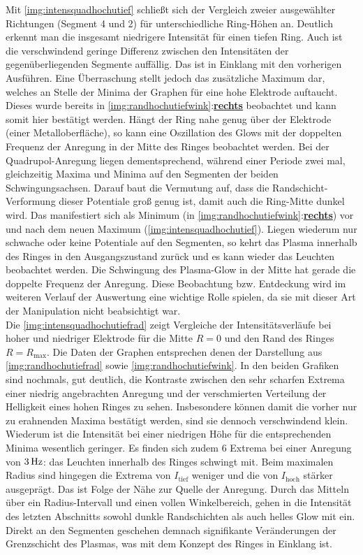 \documentclass[numbers=noenddot,a4paper,notitlepage,twoside,BCOR15mm]{scrbook}
\newcommand{\ix}[1]{_\text{#1}}
\newcommand{\fett}[1]{\textbf{#1}}
\begin{document}
					Mit \autoref{img:intensquadhochutief} schließt sich der Vergleich zweier ausgewählter Richtungen (Segment 4 und 2) für unterschiedliche Ring-Höhen an. Deutlich erkennt man die insgesamt niedrigere Intensität für einen tiefen Ring. Auch ist die verschwindend geringe Differenz zwischen den Intensitäten der gegenüberliegenden Segmente auffällig. Das ist in Einklang mit den vorherigen Ausführen. Eine Überraschung stellt jedoch das zusätzliche Maximum dar, welches an Stelle der Minima der Graphen für eine hohe Elektrode auftaucht. Dieses wurde bereits in \autoref{img:randhochutiefwink}:\underline{\fett{rechts}} beobachtet und kann somit hier bestätigt werden. Hängt der Ring nahe genug über der Elektrode (einer Metalloberfläche), so kann eine Oszillation des Glows mit der doppelten Frequenz der Anregung in der Mitte des Ringes beobachtet werden. Bei der Quadrupol-Anregung liegen dementsprechend, während einer Periode zwei mal, gleichzeitig Maxima und Minima auf den Segmenten der beiden Schwingungsachsen. Darauf baut die Vermutung auf, dass die Randschicht-Verformung dieser Potentiale groß genug ist, damit auch die Ring-Mitte dunkel wird. Das manifestiert sich als Minimum (in \autoref{img:randhochutiefwink}:\underline{\fett{rechts}}) vor und nach dem neuen Maximum (\autoref{img:intensquadhochutief}). Liegen wiederum nur schwache oder keine Potentiale auf den Segmenten, so kehrt das Plasma innerhalb des Ringes in den Ausgangszustand zurück und es kann wieder das Leuchten beobachtet werden. Die Schwingung des Plasma-Glow in der Mitte hat gerade die doppelte Frequenz der Anregung. Diese Beobachtung bzw. Entdeckung wird im weiteren Verlauf der Auswertung eine wichtige Rolle spielen, da sie mit dieser Art der Manipulation nicht beabsichtigt war.\\
					Die \autoref{img:intensquadhochutiefrad} zeigt Vergleiche der Intensitätsverläufe bei hoher und niedriger Elektrode für die Mitte $R=0$ und den Rand des Ringes $R=R\ix{max}$. Die Daten der Graphen entsprechen denen der Darstellung aus \autoref{img:randhochutiefrad} sowie \autoref{img:randhochutiefwink}. In den beiden Grafiken sind nochmals, gut deutlich, die Kontraste zwischen den sehr scharfen Extrema einer niedrig angebrachten Anregung und der verschmierten Verteilung der Helligkeit eines hohen Ringes zu sehen. Insbesondere können damit die vorher nur zu erahnenden Maxima bestätigt werden, sind sie dennoch verschwindend klein. Wiederum ist die Intensität bei einer niedrigen Höhe für die entsprechenden Minima wesentlich geringer. Es finden sich zudem 6 Extrema bei einer Anregung von $\unit[3]{Hz}$: das Leuchten innerhalb des Ringes schwingt mit. Beim maximalen Radius sind hingegen die Extrema von $I\ix{tief}$ weniger und die von $I\ix{hoch}$ stärker ausgeprägt. Das ist Folge der Nähe zur Quelle der Anregung. Durch das Mitteln über ein Radius-Intervall und einen vollen Winkelbereich, gehen in die Intensität des letzten Abschnitts sowohl dunkle Randschichten als auch helles Glow mit ein. Direkt an den Segmenten geschehen demnach signifikante Veränderungen der Grenzschicht des Plasmas, was mit dem Konzept des Ringes in Einklang ist.
\end{document}
